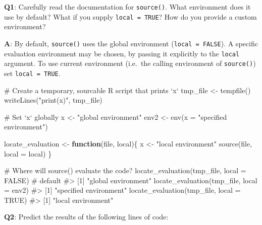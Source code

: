\documentclass[
]{krantz}
\makeatletter
\newenvironment{Shaded}{\begin{snugshade}}{\end{snugshade}}
\newcommand{\CommentTok}[1]{\textcolor[rgb]{0.56,0.35,0.01}{\textit{#1}}}
\newcommand{\ControlFlowTok}[1]{\textcolor[rgb]{0.13,0.29,0.53}{\textbf{#1}}}
\newcommand{\DataTypeTok}[1]{\textcolor[rgb]{0.13,0.29,0.53}{#1}}
\newcommand{\KeywordTok}[1]{\textcolor[rgb]{0.13,0.29,0.53}{\textbf{#1}}}
\newcommand{\NormalTok}[1]{#1}
\newcommand{\OtherTok}[1]{\textcolor[rgb]{0.56,0.35,0.01}{#1}}
\newcommand{\StringTok}[1]{\textcolor[rgb]{0.31,0.60,0.02}{#1}}
\newenvironment{kframe}{%
\medskip{}
\setlength{\fboxsep}{.8em}
 \def\at@end@of@kframe{}%
 \ifinner\ifhmode%
  \def\at@end@of@kframe{\end{minipage}}%
  \begin{minipage}{\columnwidth}%
 \fi\fi%
 \def\FrameCommand##1{\hskip\@totalleftmargin \hskip-\fboxsep
 \colorbox{shadecolor}{##1}\hskip-\fboxsep
     \hskip-\linewidth \hskip-\@totalleftmargin \hskip\columnwidth}%
 \MakeFramed {\advance\hsize-\width
   \@totalleftmargin\z@ \linewidth\hsize
   \@setminipage}}%
 {\par\unskip\endMakeFramed%
 \at@end@of@kframe}
\renewenvironment{Shaded}{\begin{kframe}}{\end{kframe}}
\renewcommand{\KeywordTok} [1]{\textcolor[rgb]{0.00,0.44,0.13}{{#1}}}
\renewcommand{\DataTypeTok}[1]{\textcolor[rgb]{0.56,0.13,0.00}{{#1}}}
\renewcommand{\StringTok}  [1]{\textcolor[rgb]{0.25,0.44,0.63}{{#1}}}
\renewcommand{\CommentTok} [1]{\textcolor[rgb]{0.38,0.63,0.69}{{#1}}}
\renewcommand{\OtherTok}   [1]{\textcolor[rgb]{0.00,0.44,0.13}{{#1}}}
\renewcommand{\NormalTok}  [1]{{#1}}
\makeatother
\begin{document}
\textbf{{Q1}}: Carefully read the documentation for \texttt{source()}. What environment does it use by default? What if you supply \texttt{local\ =\ TRUE}? How do you provide a custom environment?

\textbf{{A}}: By default, \texttt{source()} uses the global environment (\texttt{local\ =\ FALSE}). A specific evaluation environment may be chosen, by passing it explicitly to the \texttt{local} argument. To use current environment (i.e.~the calling environment of \texttt{source()}) set \texttt{local\ =\ TRUE}.

\begin{Shaded}
\begin{Highlighting}[]
\CommentTok{# Create a temporary, sourcable R script that prints `x`}
\NormalTok{tmp_file <-}\StringTok{ }\KeywordTok{tempfile}\NormalTok{()}
\KeywordTok{writeLines}\NormalTok{(}\StringTok{"print(x)"}\NormalTok{, tmp_file)}

\CommentTok{# Set `x` globally}
\NormalTok{x <-}\StringTok{ "global environment"}
\NormalTok{env2 <-}\StringTok{ }\KeywordTok{env}\NormalTok{(}\DataTypeTok{x =} \StringTok{"specified environment"}\NormalTok{)}

\NormalTok{locate_evaluation <-}\StringTok{ }\ControlFlowTok{function}\NormalTok{(file, local)\{}
\NormalTok{  x <-}\StringTok{ "local environment"}
  \KeywordTok{source}\NormalTok{(file, }\DataTypeTok{local =}\NormalTok{ local)}
\NormalTok{\}}

\CommentTok{# Where will source() evaluate the code?}
\KeywordTok{locate_evaluation}\NormalTok{(tmp_file, }\DataTypeTok{local =} \OtherTok{FALSE}\NormalTok{)  }\CommentTok{# default}
\CommentTok{#> [1] "global environment"}
\KeywordTok{locate_evaluation}\NormalTok{(tmp_file, }\DataTypeTok{local =}\NormalTok{ env2)}
\CommentTok{#> [1] "specified environment"}
\KeywordTok{locate_evaluation}\NormalTok{(tmp_file, }\DataTypeTok{local =} \OtherTok{TRUE}\NormalTok{)}
\CommentTok{#> [1] "local environment"}
\end{Highlighting}
\end{Shaded}

\textbf{{Q2}}: Predict the results of the following lines of code:
\end{document}
